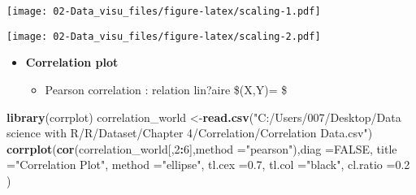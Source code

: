 \documentclass[]{book}
\newenvironment{Shaded}{\begin{snugshade}}{\end{snugshade}}
\newcommand{\KeywordTok}[1]{\textcolor[rgb]{0.13,0.29,0.53}{\textbf{#1}}}
\newcommand{\DataTypeTok}[1]{\textcolor[rgb]{0.13,0.29,0.53}{#1}}
\newcommand{\DecValTok}[1]{\textcolor[rgb]{0.00,0.00,0.81}{#1}}
\newcommand{\FloatTok}[1]{\textcolor[rgb]{0.00,0.00,0.81}{#1}}
\newcommand{\StringTok}[1]{\textcolor[rgb]{0.31,0.60,0.02}{#1}}
\newcommand{\OtherTok}[1]{\textcolor[rgb]{0.56,0.35,0.01}{#1}}
\newcommand{\OperatorTok}[1]{\textcolor[rgb]{0.81,0.36,0.00}{\textbf{#1}}}
\newcommand{\NormalTok}[1]{#1}
\providecommand{\tightlist}{%
  \setlength{\itemsep}{0pt}\setlength{\parskip}{0pt}}
\theoremstyle{definition}
\theoremstyle{definition}
\theoremstyle{definition}
\theoremstyle{remark}
\begin{document}
\texttt{[image: 02-Data\_visu\_files/figure-latex/scaling-1.pdf]}

\begin{Shaded}
\end{Shaded}

\texttt{[image: 02-Data\_visu\_files/figure-latex/scaling-2.pdf]}

\begin{itemize}
\tightlist
\item
  \textbf{Correlation plot}

  \begin{itemize}
  \tightlist
  \item
    Pearson correlation : relation lin?aire
    \$\rho(X,Y)= \$
  \end{itemize}
\end{itemize}

\begin{Shaded}
\begin{Highlighting}[]
\KeywordTok{library}\NormalTok{(corrplot)}
\NormalTok{correlation_world <-}\KeywordTok{read.csv}\NormalTok{(}\StringTok{"C:/Users/007/Desktop/Data science with R/R/Dataset/Chapter 4/Correlation/Correlation Data.csv"}\NormalTok{)}
\KeywordTok{corrplot}\NormalTok{(}\KeywordTok{cor}\NormalTok{(correlation_world[,}\DecValTok{2}\OperatorTok{:}\DecValTok{6}\NormalTok{],}\DataTypeTok{method =}\StringTok{"pearson"}\NormalTok{),}\DataTypeTok{diag =}\OtherTok{FALSE}\NormalTok{,}
\DataTypeTok{title =}\StringTok{"Correlation Plot"}\NormalTok{, }\DataTypeTok{method =}\StringTok{"ellipse"}\NormalTok{,}
\DataTypeTok{tl.cex =}\FloatTok{0.7}\NormalTok{, }\DataTypeTok{tl.col =}\StringTok{"black"}\NormalTok{, }\DataTypeTok{cl.ratio =}\FloatTok{0.2}
\NormalTok{)}
\end{Highlighting}
\end{Shaded}
\end{document}
